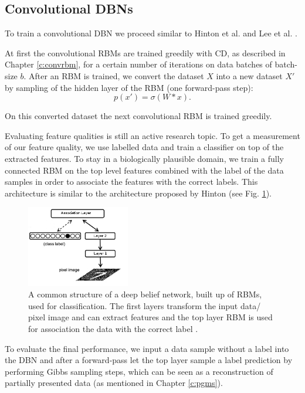 \subsection{Convolutional DBNs} \label{c:convdbns}

To train a convolutional DBN we proceed similar to Hinton et al. and Lee et al. \cite{hinton2006fast, lee2009convolutional}.

At first the convolutional RBMs are trained greedily with CD, as described in Chapter \ref{c:convrbm}, for a certain number of iterations on data batches of batch-size $b$.
After an RBM is trained, we convert the dataset $X$ into a new dataset $X'$ by sampling of the hidden layer of the RBM (one forward-pass step):
\[
p(x') = \sigma(W * x) .
\]

On this converted dataset the next convolutional RBM is trained greedily.

Evaluating feature qualities is still an active research topic.
To get a measurement of our feature quality, we use labelled data and train a classifier on top of the extracted features.
To stay in a biologically plausible domain, we train a fully connected RBM on the top level features combined with the label of the data samples in order to associate the features with the correct labels.
This architecture is similar to the architecture proposed by Hinton \cite{hinton2006fast} (see Fig. \ref{fig:dbnmnist}).

\begin{figure}
	\centering
    	\includegraphics[width=0.4\textwidth]{imgs/dbn_mnist.png} 
    \caption[A common structure of a deep belief network.]{A common structure of a deep belief network, built up of RBMs, used for classification. The first layers transform the input data/ pixel image and can extract features and the top layer RBM is used for association the data with the correct label \cite{Zorzi2013Modeling}.}
	\label{fig:dbnmnist}
\end{figure}

To evaluate the final performance, we input a data sample without a label into the DBN and after a forward-pass let the top layer sample a label prediction by performing Gibbs sampling steps, which can be seen as a reconstruction of partially presented data (as mentioned in Chapter \ref{c:pgms}).


